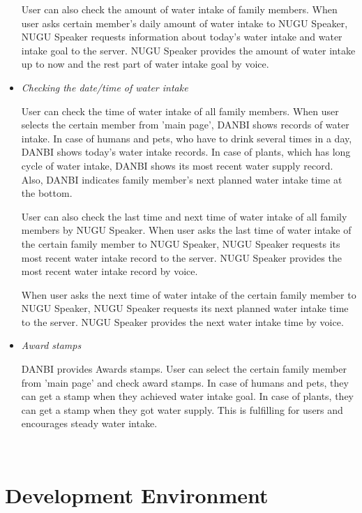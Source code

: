 \documentclass[conference]{IEEEtran}
\begin{document}
\begin{itemize}
User can also check the amount of water intake of family members. When user asks certain member's daily amount of water intake to NUGU Speaker, NUGU Speaker requests information about today's water intake and water intake goal to the server. NUGU Speaker provides the amount of water intake up to now and the rest part of water intake goal by voice.
\item \textit{Checking the date/time of water intake} 

User can check the time of water intake of all family members. When user selects the certain member from 'main page', DANBI shows records of water intake. In case of humans and pets, who have to drink several times in a day, DANBI shows today's water intake records. In case of plants, which has long cycle of water intake, DANBI shows its most recent water supply record. Also, DANBI indicates family member's next planned water intake time at the bottom.

User can also check the last time and next time of water intake of all family members by NUGU Speaker. When user asks the last time of water intake of the certain family member to NUGU Speaker, NUGU Speaker requests its most recent water intake record to the server. NUGU Speaker provides the most recent water intake record by voice.

When user asks the next time of water intake of the certain family member to NUGU Speaker, NUGU Speaker requests its next planned water intake time to the server. NUGU Speaker provides the next water intake time by voice.
\item \textit{Award stamps}

DANBI provides Awards stamps. User can select the certain family member from 'main page' and check award stamps. In case of humans and pets, they can get a stamp when they achieved water intake goal. In case of plants, they can get a stamp when they got water supply. This is fulfilling for users and encourages steady water intake.
\end{itemize}

\ 

\section{Development Environment}
\end{document}
